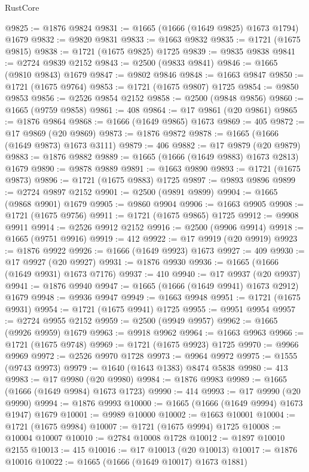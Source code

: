 \begin{lexlean}{RustCore}
\begin{coremodule}
@9825 := @1876 @9824
@9831 := @1665 (@1666 (@1649 @9825) @1673 @1794) @1679
@9832 := @9820 @9831
@9833 := @1663 @9832
@9835 := @1721 (@1675 @9815)
@9838 := @1721 (@1675 @9825) @1725
@9839 := @9835 @9838
@9841 := @2724 @9839 @2152
@9843 := @2500 (@9833 @9841)
@9846 := @1665 (@9810 @9843) @1679
@9847 := @9802 @9846
@9848 := @1663 @9847
@9850 := @1721 (@1675 @9764)
@9853 := @1721 (@1675 @9807) @1725
@9854 := @9850 @9853
@9856 := @2526 @9854 @2152
@9858 := @2500 (@9848 @9856)
@9860 := @1665 (@9759 @9858)
@9861 := 408
@9864 := @17 @9861 (@20 @9861)
@9865 := @1876 @9864
@9868 := @1666 (@1649 @9865) @1673
@9869 := 405
@9872 := @17 @9869 (@20 @9869)
@9873 := @1876 @9872
@9878 := @1665 (@1666 (@1649 @9873) @1673 @3111)
@9879 := 406
@9882 := @17 @9879 (@20 @9879)
@9883 := @1876 @9882
@9889 := @1665 (@1666 (@1649 @9883) @1673 @2813) @1679
@9890 := @9878 @9889
@9891 := @1663 @9890
@9893 := @1721 (@1675 @9873)
@9896 := @1721 (@1675 @9883) @1725
@9897 := @9893 @9896
@9899 := @2724 @9897 @2152
@9901 := @2500 (@9891 @9899)
@9904 := @1665 (@9868 @9901) @1679
@9905 := @9860 @9904
@9906 := @1663 @9905
@9908 := @1721 (@1675 @9756)
@9911 := @1721 (@1675 @9865) @1725
@9912 := @9908 @9911
@9914 := @2526 @9912 @2152
@9916 := @2500 (@9906 @9914)
@9918 := @1665 (@9751 @9916)
@9919 := 412
@9922 := @17 @9919 (@20 @9919)
@9923 := @1876 @9922
@9926 := @1666 (@1649 @9923) @1673
@9927 := 409
@9930 := @17 @9927 (@20 @9927)
@9931 := @1876 @9930
@9936 := @1665 (@1666 (@1649 @9931) @1673 @7176)
@9937 := 410
@9940 := @17 @9937 (@20 @9937)
@9941 := @1876 @9940
@9947 := @1665 (@1666 (@1649 @9941) @1673 @2912) @1679
@9948 := @9936 @9947
@9949 := @1663 @9948
@9951 := @1721 (@1675 @9931)
@9954 := @1721 (@1675 @9941) @1725
@9955 := @9951 @9954
@9957 := @2724 @9955 @2152
@9959 := @2500 (@9949 @9957)
@9962 := @1665 (@9926 @9959) @1679
@9963 := @9918 @9962
@9964 := @1663 @9963
@9966 := @1721 (@1675 @9748)
@9969 := @1721 (@1675 @9923) @1725
@9970 := @9966 @9969
@9972 := @2526 @9970 @1728
@9973 := @9964 @9972
@9975 := @1555 (@9743 @9973)
@9979 := @1640 (@1643 @1383) @8474 @5838
@9980 := 413
@9983 := @17 @9980 (@20 @9980)
@9984 := @1876 @9983
@9989 := @1665 (@1666 (@1649 @9984) @1673 @1723)
@9990 := 414
@9993 := @17 @9990 (@20 @9990)
@9994 := @1876 @9993
@10000 := @1665 (@1666 (@1649 @9994) @1673 @1947) @1679
@10001 := @9989 @10000
@10002 := @1663 @10001
@10004 := @1721 (@1675 @9984)
@10007 := @1721 (@1675 @9994) @1725
@10008 := @10004 @10007
@10010 := @2784 @10008 @1728
@10012 := @1897 @10010 @2155
@10013 := 415
@10016 := @17 @10013 (@20 @10013)
@10017 := @1876 @10016
@10022 := @1665 (@1666 (@1649 @10017) @1673 @1881)

\end{coremodule}
\end{lexlean}

